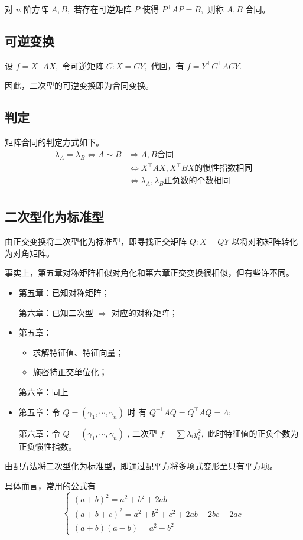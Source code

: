 对 $ n $ 阶方阵 $ A,B, $
若存在可逆矩阵 $ P $ 使得 $ P^\top AP = B, $ 
则称 $ A,B $ 合同。

\subsection{可逆变换}

设 $ f = X^\top AX, $ 
令可逆矩阵 $ C: X = CY, $ 
代回，有 $ f = Y^\top C^\top ACY. $ 

因此，二次型的可逆变换即为合同变换。

\subsection{判定}

矩阵合同的判定方式如下。
\begin{equation*}
    \begin{aligned}
        \lambda_A = \lambda_B\Leftrightarrow A\sim B &\Rightarrow A,B \textrm{合同} \\
        & \Leftrightarrow X^\top AX, X^\top BX \textrm{的惯性指数相同}\\ 
        & \Leftrightarrow \lambda_A,\lambda_B  \textrm{正负数的个数相同} \\ 
    \end{aligned}
\end{equation*}

\subsection{二次型化为标准型}


由正交变换将二次型化为标准型，即寻找正交矩阵 $ Q:X = QY $ 以将对称矩阵转化为对角矩阵。

事实上，第五章对称矩阵相似对角化和第六章正交变换很相似，但有些许不同。

\begin{itemize}
    \item 第五章：已知对称矩阵；
          
          第六章：已知二次型 $ \Rightarrow $ 对应的对称矩阵；
    \item 第五章：\begin{itemize}
            \item 求解特征值、特征向量；
            \item 施密特正交单位化；
        \end{itemize}
        
          第六章：同上
    \item 第五章：令 $ Q = (\gamma_1,\cdots,\gamma_n) $ 时
        有 $ Q^{-1}AQ = Q^\top AQ = \Lambda; $
          
          第六章：令 $ Q = (\gamma_1,\cdots,\gamma_n) $ ,
        二次型 $ f = \sum \lambda_iy_i^2, $
        此时特征值的正负个数为正负惯性指数。
\end{itemize}


由配方法将二次型化为标准型，即通过配平方将多项式变形至只有平方项。

具体而言，常用的公式有
$$
    \begin{cases}
        (a+b)^2 = a^2 + b^2 + 2ab \\
        (a+b+c)^2 = a^2 + b^2 + c^2 + 2ab + 2bc + 2ac \\
        (a+b)(a-b) = a^2 - b^2
    \end{cases}
$$ 

